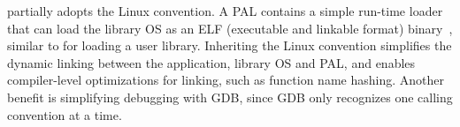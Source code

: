 \Thehostabi{} partially adopts the \graphenearch{} Linux convention. %
A PAL contains a simple run-time loader that can load the library OS as an ELF (executable and linkable format) binary~\cite{elf-format}, similar to  for loading a user library.
Inheriting the Linux convention
simplifies the dynamic linking between the application, library OS and PAL,
and enables compiler-level optimizations for linking,
such as function name hashing.
Another benefit is simplifying debugging with GDB, since GDB only recognizes one calling convention at a time.









